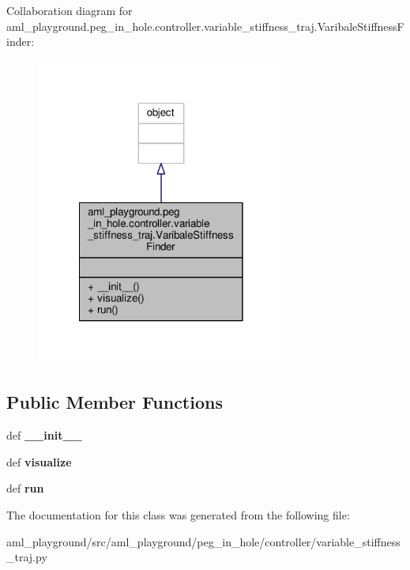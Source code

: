 Collaboration diagram for aml\-\_\-playground.\-peg\-\_\-in\-\_\-hole.\-controller.\-variable\-\_\-stiffness\-\_\-traj.\-Varibale\-Stiffness\-Finder\-:
\nopagebreak
\begin{figure}[H]
\begin{center}
\leavevmode
\includegraphics[width=234pt]{classaml__playground_1_1peg__in__hole_1_1controller_1_1variable__stiffness__traj_1_1_varibale_stiffness_finder__coll__graph}
\end{center}
\end{figure}
\subsection*{Public Member Functions}
\begin{DoxyCompactItemize}
\item 
\hypertarget{classaml__playground_1_1peg__in__hole_1_1controller_1_1variable__stiffness__traj_1_1_varibale_stiffness_finder_aa994c6fdffa767f6fe2b559b63171230}{def {\bfseries \-\_\-\-\_\-init\-\_\-\-\_\-}}\label{classaml__playground_1_1peg__in__hole_1_1controller_1_1variable__stiffness__traj_1_1_varibale_stiffness_finder_aa994c6fdffa767f6fe2b559b63171230}

\item 
\hypertarget{classaml__playground_1_1peg__in__hole_1_1controller_1_1variable__stiffness__traj_1_1_varibale_stiffness_finder_a79bd272a4662126217155b91116d4e8a}{def {\bfseries visualize}}\label{classaml__playground_1_1peg__in__hole_1_1controller_1_1variable__stiffness__traj_1_1_varibale_stiffness_finder_a79bd272a4662126217155b91116d4e8a}

\item 
\hypertarget{classaml__playground_1_1peg__in__hole_1_1controller_1_1variable__stiffness__traj_1_1_varibale_stiffness_finder_a4b4836b6cac32d809e150badcccbdc4c}{def {\bfseries run}}\label{classaml__playground_1_1peg__in__hole_1_1controller_1_1variable__stiffness__traj_1_1_varibale_stiffness_finder_a4b4836b6cac32d809e150badcccbdc4c}

\end{DoxyCompactItemize}


The documentation for this class was generated from the following file\-:\begin{DoxyCompactItemize}
\item 
aml\-\_\-playground/src/aml\-\_\-playground/peg\-\_\-in\-\_\-hole/controller/variable\-\_\-stiffness\-\_\-traj.\-py\end{DoxyCompactItemize}
